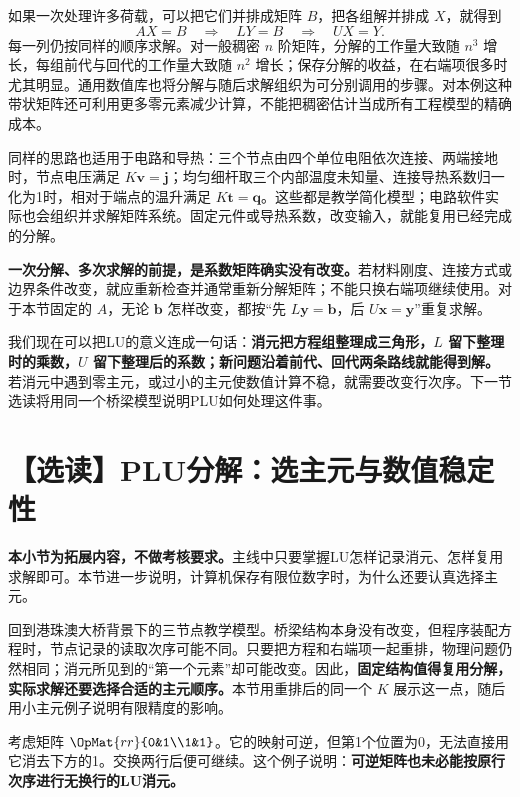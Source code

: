 \documentclass[a4paper,12pt,twoside,openany,fontset=none]{ctexbook}
\numberwithin{equation}{chapter}
\begin{document}
如果一次处理许多荷载，可以把它们并排成矩阵 $B$，把各组解并排成 $X$，就得到
\[
 AX=B\quad\Longrightarrow\quad LY=B\quad\Longrightarrow\quad UX=Y.
\]
每一列仍按同样的顺序求解。对一般稠密 $n$ 阶矩阵，分解的工作量大致随 $n^3$ 增长，每组前代与回代的工作量大致随 $n^2$ 增长；保存分解的收益，在右端项很多时尤其明显。通用数值库也将分解与随后求解组织为可分别调用的步骤\cite{lapack-linear}。对本例这种带状矩阵还可利用更多零元素减少计算，不能把稠密估计当成所有工程模型的精确成本。

同样的思路也适用于电路和导热：三个节点由四个单位电阻依次连接、两端接地时，节点电压满足 $K\boldsymbol v=\boldsymbol j$；均匀细杆取三个内部温度未知量、连接导热系数归一化为1时，相对于端点的温升满足 $K\boldsymbol t=\boldsymbol q$。这些都是教学简化模型；电路软件实际也会组织并求解矩阵系统\cite{ngspice-matrix}。固定元件或导热系数，改变输入，就能复用已经完成的分解。

\textbf{一次分解、多次求解的前提，是系数矩阵确实没有改变。}若材料刚度、连接方式或边界条件改变，就应重新检查并通常重新分解矩阵；不能只换右端项继续使用。对于本节固定的 $A$，无论 $\boldsymbol b$ 怎样改变，都按“先 $L\boldsymbol y=\boldsymbol b$，后 $U\boldsymbol x=\boldsymbol y$”重复求解。

我们现在可以把LU的意义连成一句话：\textbf{消元把方程组整理成三角形，$L$ 留下整理时的乘数，$U$ 留下整理后的系数；新问题沿着前代、回代两条路线就能得到解。}若消元中遇到零主元，或过小的主元使数值计算不稳，就需要改变行次序。下一节选读将用同一个桥梁模型说明PLU如何处理这件事。

\section{【选读】PLU分解：选主元与数值稳定性}
\label{sec:three-plu}

\textbf{本小节为拓展内容，不做考核要求。}主线中只要掌握LU怎样记录消元、怎样复用求解即可。本节进一步说明，计算机保存有限位数字时，为什么还要认真选择主元。


回到港珠澳大桥背景下的三节点教学模型。桥梁结构本身没有改变，但程序装配方程时，节点记录的读取次序可能不同。只要把方程和右端项一起重排，物理问题仍然相同；消元所见到的“第一个元素”却可能改变。因此，\textbf{固定结构值得复用分解，实际求解还要选择合适的主元顺序。}本节用重排后的同一个 $K$ 展示这一点，随后用小主元例子说明有限精度的影响。


考虑矩阵 $\OpMat{rr}{0&1\\1&1}$。它的映射可逆，但第1个位置为0，无法直接用它消去下方的1。交换两行后便可继续。这个例子说明：\textbf{可逆矩阵也未必能按原行次序进行无换行的LU消元。}
\end{document}
